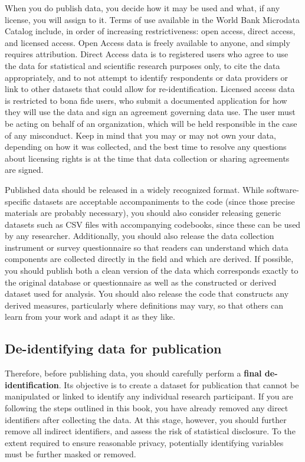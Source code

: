 When you do publish data, you decide how it may be used and what, if any license, you will assign to it.
Terms of use available in the World Bank Microdata Catalog include, in order of increasing restrictiveness: open access, direct access, and licensed access.
Open Access data is freely available to anyone, and simply requires attribution.
Direct Access data is to registered users who agree to use the data for statistical and scientific research purposes only, 
to cite the data appropriately, and to not attempt to identify respondents or data providers or link to other datasets that could allow for re-identification. 
Licensed access data is restricted to bona fide users, who submit a documented application for how they will use the data and sign an agreement governing data use. 
The user must be acting on behalf of an organization, which will be held responsible in the case of any misconduct.
Keep in mind that you may or may not own your data,
depending on how it was collected,
and the best time to resolve any questions about licensing rights
is at the time that data collection or sharing agreements are signed.

Published data should be released in a widely recognized format.
While software-specific datasets are acceptable accompaniments to the code
(since those precise materials are probably necessary),
you should also consider releasing generic datasets
such as CSV files with accompanying codebooks,
since these can be used by any researcher.
Additionally, you should also release
the data collection instrument or survey questionnaire
so that readers can understand which data components are
collected directly in the field and which are derived.
If possible, you should publish both a clean version of the data
which corresponds exactly to the original database or questionnaire
as well as the constructed or derived dataset used for analysis.
You should also release the code
that constructs any derived measures,
particularly where definitions may vary,
so that others can learn from your work and adapt it as they like.

\subsection{De-identifying data for publication}
Therefore, before publishing data,
you should carefully perform a \textbf{final de-identification}.
Its objective is to create a dataset for publication
that cannot be manipulated or linked to identify any individual research participant.
If you are following the steps outlined in this book,
you have already removed any direct identifiers after collecting the data.
At this stage, however, you should further remove
all indirect identifiers, and assess the risk of statistical disclosure.
To the extent required to ensure reasonable privacy,
potentially identifying variables must be further masked or removed.

